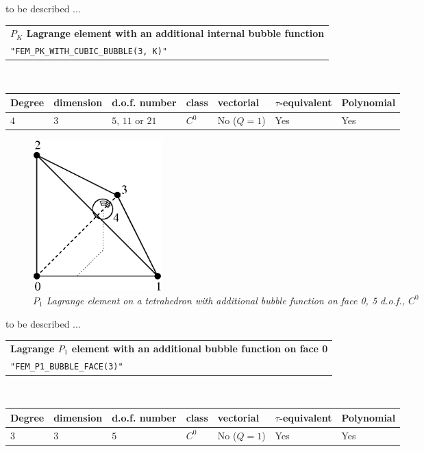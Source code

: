 \documentclass[11pt,a4paper]{article}
\begin{document}
to be described ...

\begin{center}
\begin{tabular}{|m{16.11cm}|} \hline 
{ \bf $P_K$ Lagrange element with an additional internal bubble function}\\
{\tt "FEM\_PK\_WITH\_CUBIC\_BUBBLE(3, K)"} 
\end{tabular} \\ \vspace{-1pt} 
\begin{tabular}{|m{2cm}|m{2cm}|m{2.5cm}|m{1.2cm}|m{2cm}|m{2cm}|m{1.8cm}|} \hline 
Degree & dimension & d.o.f. number & class & vectorial & \mbox{$\tau$-equivalent} & Polynomial\\ \hline
$4$ & $3$ & $5$, $11$ or $21$ & $C^0$ & No \mbox{($Q = 1$)} & Yes & Yes\\ \hline
\end{tabular}
\end{center}

\begin{figure}[H]
  \begin{center}
    \includegraphics[width=5cm,angle=0]{getfemlist_tetrahedron_P1_bubble_face.eps}
  \end{center}
  \caption{ \it $P_1$ Lagrange element on a tetrahedron with additional bubble function on face 0, 5 d.o.f., $C^0$} 
  \label{fig:tetrahedron_p1_bubble_face}
\end{figure}

to be described ...

\begin{center}
\begin{tabular}{|m{16.11cm}|} \hline 
{ \bf Lagrange $P_1$ element with an additional bubble function on face 0}\\
{\tt "FEM\_P1\_BUBBLE\_FACE(3)"} 
\end{tabular} \\ \vspace{-1pt} 
\begin{tabular}{|m{2cm}|m{2cm}|m{2.5cm}|m{1.2cm}|m{2cm}|m{2cm}|m{1.8cm}|} \hline 
Degree & dimension & d.o.f. number & class & vectorial & \mbox{$\tau$-equivalent} & Polynomial\\ \hline
$3$ & $3$ & $5$ & $C^0$ & No \mbox{($Q = 1$)} & Yes & Yes\\ \hline
\end{tabular}
\end{center}
\end{document}
